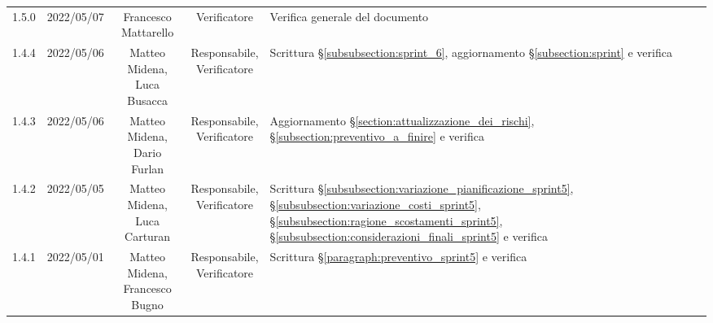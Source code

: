 \begin{center}
\begin{longtable}[c]{c | c | c | c | p{5cm}}
		1.5.0                                                      & 2022/05/07 & Francesco Mattarello                   & Verificatore   & Verifica generale del documento                                                                                                           \\
		1.4.4                                                      & 2022/05/06 & \Shortunderstack{Matteo Midena,                                                                                                                                                                     \\Luca Busacca} & \Shortunderstack{Responsabile,\\Verificatore} & Scrittura §\ref{subsubsection:sprint_6}, aggiornamento §\ref{subsection:sprint} e verifica\\
		1.4.3                                                      & 2022/05/06 & \Shortunderstack{Matteo Midena,                                                                                                                                                                     \\Dario Furlan} & \Shortunderstack{Responsabile,\\Verificatore} & Aggiornamento §\ref{section:attualizzazione_dei_rischi}, §\ref{subsection:preventivo_a_finire} e verifica\\
		1.4.2                                                      & 2022/05/05 & \Shortunderstack{Matteo Midena,                                                                                                                                                                     \\Luca Carturan} & \Shortunderstack{Responsabile,\\Verificatore} & Scrittura §\ref{subsubsection:variazione_pianificazione_sprint5}, §\ref{subsubsection:variazione_costi_sprint5}, §\ref{subsubsection:ragione_scostamenti_sprint5}, §\ref{subsubsection:considerazioni_finali_sprint5} e verifica\\
		1.4.1                                                      & 2022/05/01 & \Shortunderstack{Matteo Midena,                                                                                                                                                                     \\Francesco Bugno} & \Shortunderstack{Responsabile,\\Verificatore} & Scrittura §\ref{paragraph:preventivo_sprint5} e verifica\\

\end{longtable}
\end{center}

